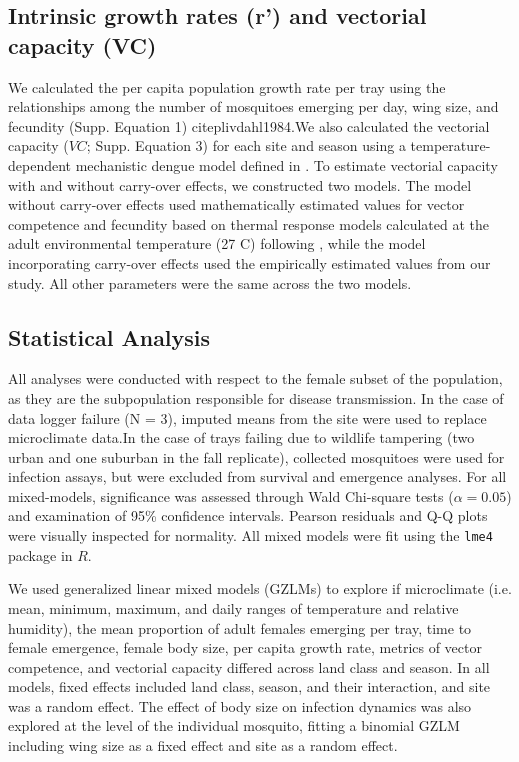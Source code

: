 \documentclass[12pt]{article}
\begin{document}
\subsection{Intrinsic growth rates (r') and vectorial capacity (VC)}

We calculated the per capita population growth rate per tray using the  relationships among the number of mosquitoes emerging per day, wing size, and fecundity (Supp. Equation 1) citep{livdahl1984}.We also calculated the vectorial capacity ($VC$; Supp. Equation 3) for each site and season using a temperature-dependent mechanistic dengue model defined in \citet{mordecai2017}. To estimate vectorial capacity with and without carry-over effects, we constructed two models. The model without carry-over effects used mathematically estimated values for vector competence and fecundity based on thermal response models calculated at the adult environmental temperature (27 \degree C) following \citep{mordecai2017}, while the model incorporating carry-over effects used the empirically estimated values from our study. All other parameters were the same across the two models.

\subsection{Statistical Analysis}

All analyses were conducted with respect to the female subset of the population, as they are the subpopulation responsible for disease transmission. In the case of data logger failure (N = 3), imputed means from the site were used to replace microclimate data.In the case of trays failing due to wildlife tampering (two urban and one suburban in the fall replicate), collected mosquitoes were used for infection assays, but were excluded from survival and emergence analyses. For all mixed-models, significance was assessed through Wald Chi-square tests ($\alpha=0.05$) and examination of 95\% confidence intervals. Pearson residuals and Q-Q plots were visually inspected for normality. All mixed models were fit using the \texttt{lme4} package in $R$.

We used generalized linear mixed models (GZLMs) to explore if microclimate (i.e. mean, minimum, maximum, and daily ranges of temperature and relative humidity), the mean proportion of adult females emerging per tray, time to female emergence, female body size, per capita growth rate, metrics of vector competence, and vectorial capacity differed across land class and season. In all models, fixed effects included land class, season, and their interaction, and site was a random effect. The effect of body size on infection dynamics was also explored at the level of the individual mosquito, fitting a binomial GZLM including wing size as a fixed effect and site as a random effect.
\end{document}

